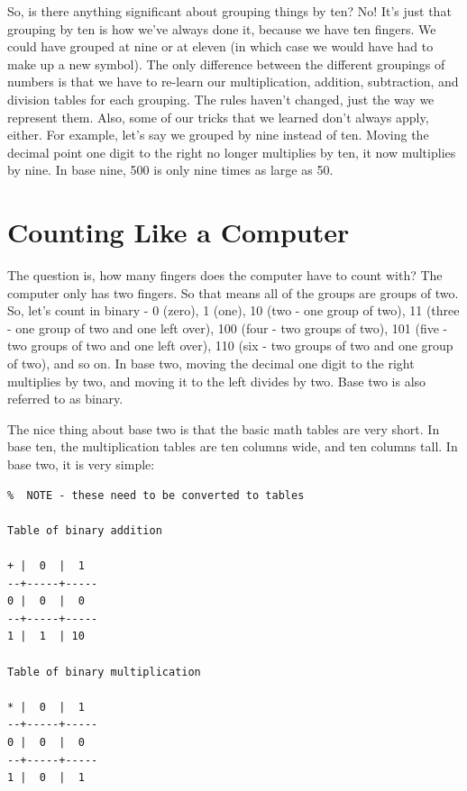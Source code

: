 So, is there anything significant about grouping things by ten?  No!  It's
just that grouping by ten is how we've always done it, because we have
ten fingers.  We could have grouped at nine or at eleven (in which case
we would have had to make up a new symbol).  The only difference between
the different groupings of numbers is that we have to re-learn our
multiplication, addition, subtraction, and division tables for each
grouping.  The rules
haven't changed, just the way we represent them.  Also, some of our
tricks that we learned don't always apply, either.  For example, let's
say we grouped by nine instead of ten.  Moving the decimal point one
digit to the right no longer multiplies by ten, it now multiplies by nine.
In base nine, 500 is only nine times as large as 50.

\section{Counting Like a Computer}

The question is, how many fingers does the computer have to count with?
The computer only has two fingers.  So that means all of the groups are 
groups of two.  So, let's count in binary - 0 (zero), 1 (one), 10 (two - 
one group of two), 11 (three - one group of two and one left over), 
100 (four - two groups of two), 101 (five - two groups of two and one left 
over), 110 (six - two groups of two and one group of two), and so on.  
In base two, moving the decimal one digit to the right multiplies by two, and 
moving it to the left divides by two.  Base two is also referred to
as binary.

The nice thing about base two is that the basic math tables are very
short.  In base ten, the multiplication tables are ten columns wide,
and ten columns tall.  In base two, it is very simple:

\begin{simpletyping}
\begin{lstlisting}
%  NOTE - these need to be converted to tables 

Table of binary addition

+ |  0  |  1  
--+-----+-----
0 |  0  |  0  
--+-----+-----
1 |  1  | 10  

Table of binary multiplication

* |  0  |  1
--+-----+-----
0 |  0  |  0
--+-----+-----
1 |  0  |  1

\end{lstlisting}
\end{simpletyping}

